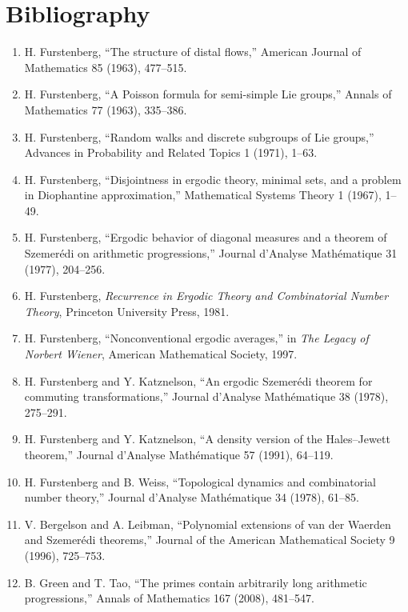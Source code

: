\section*{Bibliography}
\begin{enumerate}
\item H. Furstenberg, ``The structure of distal flows,'' American Journal of Mathematics 85 (1963), 477--515.
\item H. Furstenberg, ``A Poisson formula for semi-simple Lie groups,'' Annals of Mathematics 77 (1963), 335--386.
\item H. Furstenberg, ``Random walks and discrete subgroups of Lie groups,'' Advances in Probability and Related Topics 1 (1971), 1--63.
\item H. Furstenberg, ``Disjointness in ergodic theory, minimal sets, and a problem in Diophantine approximation,'' Mathematical Systems Theory 1 (1967), 1--49.
\item H. Furstenberg, ``Ergodic behavior of diagonal measures and a theorem of Szemer\'edi on arithmetic progressions,'' Journal d'Analyse Math\'ematique 31 (1977), 204--256.
\item H. Furstenberg, \emph{Recurrence in Ergodic Theory and Combinatorial Number Theory}, Princeton University Press, 1981.
\item H. Furstenberg, ``Nonconventional ergodic averages,'' in \emph{The Legacy of Norbert Wiener}, American Mathematical Society, 1997.
\item H. Furstenberg and Y. Katznelson, ``An ergodic Szemer\'edi theorem for commuting transformations,'' Journal d'Analyse Math\'ematique 38 (1978), 275--291.
\item H. Furstenberg and Y. Katznelson, ``A density version of the Hales--Jewett theorem,'' Journal d'Analyse Math\'ematique 57 (1991), 64--119.
\item H. Furstenberg and B. Weiss, ``Topological dynamics and combinatorial number theory,'' Journal d'Analyse Math\'ematique 34 (1978), 61--85.
\item V. Bergelson and A. Leibman, ``Polynomial extensions of van der Waerden and Szemer\'edi theorems,'' Journal of the American Mathematical Society 9 (1996), 725--753.
\item B. Green and T. Tao, ``The primes contain arbitrarily long arithmetic progressions,'' Annals of Mathematics 167 (2008), 481--547.
\end{enumerate}
